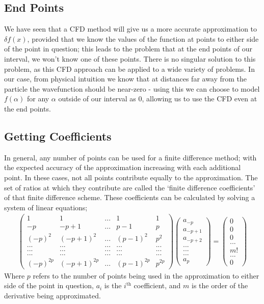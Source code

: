 \subsection{End Points}
We have seen that a CFD method will give us a more accurate approximation to $\delta f(x)$, provided that we know the values of the function at points to either side of the point in question; this leads to the problem that at the end points of our interval, we won't know one of these points. There is no singular solution to this problem, as this CFD approach can be applied to a wide variety of problems. In our case, from physical intuition we know that at distances far away from the particle the wavefunction should be near-zero - using this we can choose to model $f(\alpha)$ for any $\alpha$ outside of our interval as $0$, allowing us to use the CFD even at the end points.

\subsection{Getting Coefficients}
In general, any number of points can be used for a finite difference method; with the expected accuracy of the approximation increasing with each additional point. In these cases, not all points contribute equally to the approximation. The set of ratios at which they contribute are called the `finite difference coefficients' of that finite difference scheme. These coefficients can be calculated by solving a system of linear equations;
\begin{align*}
\begin{pmatrix}
1&1&...&1&1\\
-p&-p+1&...&p-1&p\\
(-p)^{2}&(-p+1)^{2}&...&(p-1)^{2}&p^{2}\\
...&...&...&...&...\\
...&...&...&...&...\\
...&...&...&...&...\\
(-p)^{2p}&(-p+1)^{2p}&...&(p-1)^{2p}&p^{2p}
\end{pmatrix}{\begin{pmatrix}
a_{-p}\\
a_{-p+1}\\
a_{-p+2}\\
...\\
...\\
...\\
a_{p}
\end{pmatrix}} = {\begin{pmatrix}
0\\
0\\
0\\
...\\
m!\\
...\\
0
\end{pmatrix}}
\end{align*}
Where $p$ refers to the number of points being used in the approximation to either side of the point in question, $a_{i}$ is the $i^{\text{th}}$ coefficient, and $m$ is the order of the derivative being approximated. 
